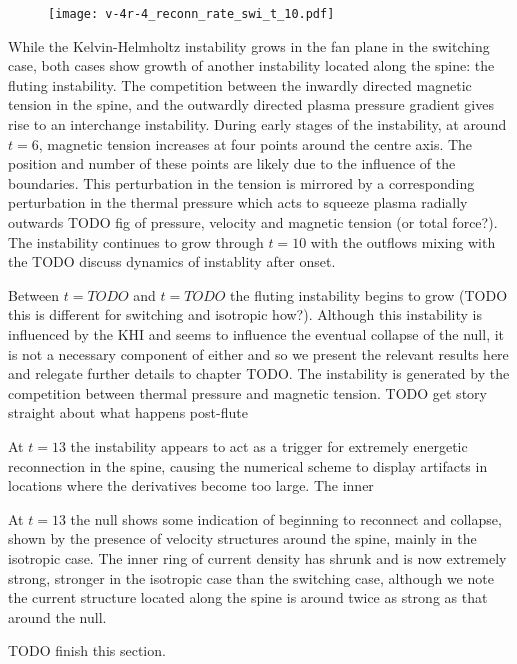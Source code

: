 \begin{figure}[t]
  \centering
  \texttt{[image: v-4r-4\_reconn\_rate\_swi\_t\_10.pdf]}
  \caption{}%
  \label{fig:v-4r-4_reconn_rate_swi_t_10}
\end{figure}

While the Kelvin-Helmholtz instability grows in the fan plane in the switching case, both cases show growth of another instability located along the spine: the fluting instability. The competition between the inwardly directed magnetic tension in the spine, and the outwardly directed plasma pressure gradient gives rise to an interchange instability. During early stages of the instability, at around $t=6$, magnetic tension increases at four points around the centre axis. The position and number of these points are likely due to the influence of the boundaries. This perturbation in the tension is mirrored by a corresponding perturbation in the thermal pressure which acts to squeeze plasma radially outwards TODO fig of pressure, velocity and magnetic tension (or total force?). The instability continues to grow through $t=10$ with the outflows mixing with the TODO discuss dynamics of instablity after onset. 

Between $t=TODO$ and $t=TODO$ the fluting instability begins to grow (TODO this is different for switching and isotropic how?). Although this instability is influenced by the KHI and seems to influence the eventual collapse of the null, it is not a necessary component of either and so we present the relevant results here and relegate further details to chapter TODO. The instability is generated by the competition between thermal pressure and magnetic tension. 
TODO get story straight about what happens post-flute

At $t=13$ the instability appears to act as a trigger for extremely energetic reconnection in the spine, causing the numerical scheme to display artifacts in locations where the derivatives become too large. The inner

At $t=13$ the null shows some indication of beginning to reconnect and collapse, shown by the presence of velocity structures around the spine, mainly in the isotropic case. The inner ring of current density has shrunk and is now extremely strong, stronger in the isotropic case than the switching case, although we note the current structure located along the spine is around twice as strong as that around the null.

TODO finish this section.


